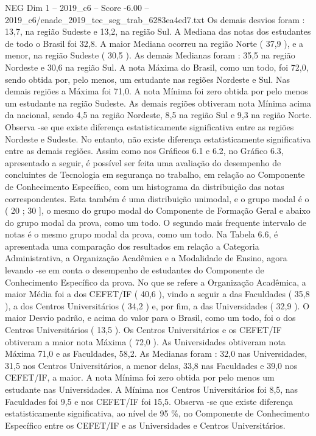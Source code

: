 \begin{textsample}{NEG Dim 1 – 2019\_c6 – Score -6.00 – 2019\_c6/enade\_2019\_tec\_seg\_trab\_6283ea4ed7.txt}
Os demais desvios foram : 13,7, na região Sudeste e 13,2, na região Sul.
A Mediana das notas dos estudantes de todo o Brasil foi 32,8.
A maior Mediana ocorreu na região Norte ( 37,9 ), e a menor, na região Sudeste ( 30,5 ).
As demais Medianas foram : 35,5 na região Nordeste e 30,6 na região Sul.
A nota Máxima do Brasil, como um todo, foi 72,0, sendo obtida por, pelo menos, um estudante nas regiões Nordeste e Sul.
Nas demais regiões a Máxima foi 71,0.
A nota Mínima foi zero obtida por pelo menos um estudante na região Sudeste.
As demais regiões obtiveram nota Mínima acima da nacional, sendo 4,5 na região Nordeste, 8,5 na região Sul e 9,3 na região Norte.
Observa -se que existe diferença estatisticamente significativa entre as regiões Nordeste e Sudeste.
No entanto, não existe diferença estatisticamente significativa entre as demais regiões.
Assim como nos Gráficos 6.1 e 6.2, no Gráfico 6.3, apresentado a seguir, é possível ser feita uma avaliação do desempenho de concluintes de Tecnologia em segurança no trabalho, em relação ao Componente de Conhecimento Específico, com um histograma da distribuição das notas correspondentes.
Esta também é uma distribuição unimodal, e o grupo modal é o ( 20 ; 30 ], o mesmo do grupo modal do Componente de Formação Geral e abaixo do grupo modal da prova, como um todo.
O segundo mais frequente intervalo de notas é o mesmo grupo modal da prova, como um todo.
Na Tabela 6.6, é apresentada uma comparação dos resultados em relação a Categoria Administrativa, a Organização Acadêmica e a Modalidade de Ensino, agora levando -se em conta o desempenho de estudantes do Componente de Conhecimento Específico da prova.
No que se refere a Organização Acadêmica, a maior Média foi a dos CEFET/IF ( 40,6 ), vindo a seguir a das Faculdades ( 35,8 ), a dos Centros Universitários ( 34,2 ) e, por fim, a das Universidades ( 32,9 ).
O maior Desvio padrão, e acima do valor para o Brasil, como um todo, foi o dos Centros Universitários ( 13,5 ).
Os Centros Universitários e os CEFET/IF obtiveram a maior nota Máxima ( 72,0 ).
As Universidades obtiveram nota Máxima 71,0 e as Faculdades, 58,2.
As Medianas foram : 32,0 nas Universidades, 31,5 nos Centros Universitários, a menor delas, 33,8 nas Faculdades e 39,0 nos CEFET/IF, a maior.
A nota Mínima foi zero obtida por pelo menos um estudante nas Universidades.
A Mínima nos Centros Universitários foi 8,5, nas Faculdades foi 9,5 e nos CEFET/IF foi 15,5.
Observa -se que existe diferença estatisticamente significativa, ao nível de 95 \%, no Componente de Conhecimento Específico entre os CEFET/IF e as Universidades e Centros Universitários.

\end{textsample}
